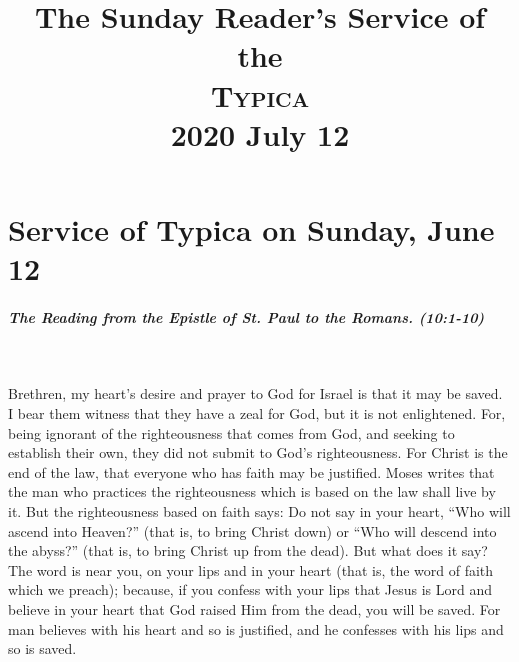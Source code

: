 \documentclass[twoside, letterpaper, 12pt]{report}
\title{The Sunday Reader's Service of the \\ \textsc{Typica} \\ 2020 July 12}
\date{}
\author{}
\begin{document}
\maketitle
\pagestyle{empty} %
\cleardoublepage
\pagestyle{plain}
\setcounter{page}{1} %
\chapter*{Service of Typica on Sunday, June 12}

\readerline{\throughtheprayers{}}

\trisagionNeedsAmen[reader]








\paragraph{The Reading from the Epistle of St. Paul to the Romans. (10:1-10)}\mbox{}\\

\begin{maybetwocolumns}
  Brethren, my heart’s desire and prayer to God for Israel is that it may be saved. I bear them
  witness that they have a zeal for God, but it is not enlightened. For, being ignorant of the
  righteousness that comes from God, and seeking to establish their own, they did not submit to
  God’s righteousness. For Christ is the end of the law, that everyone who has faith may be justified.
  Moses writes that the man who practices the righteousness which is based on the law shall live by
  it. But the righteousness based on faith says: Do not say in your heart, “Who will ascend into
  Heaven?” (that is, to bring Christ down) or “Who will descend into the abyss?” (that is, to bring
  Christ up from the dead). But what does it say? The word is near you, on your lips and in your
  heart (that is, the word of faith which we preach); because, if you confess with your lips that Jesus
  is Lord and believe in your heart that God raised Him from the dead, you will be saved. For man
  believes with his heart and so is justified, and he confesses with his lips and so is saved.
\end{maybetwocolumns}
\end{document}
